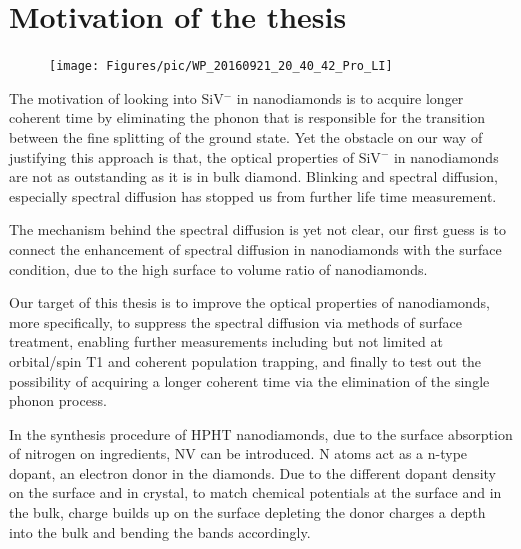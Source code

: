 
\section[Motivation of the thesis]{Motivation of the thesis}
\FloatBarrier
\begin{figure}[h]
	\centering
	\texttt{[image: Figures/pic/WP\_20160921\_20\_40\_42\_Pro\_LI]}
	\caption{}
	\label{fig:wp20160921204042proli}
\end{figure}
\FloatBarrier
The motivation of looking into SiV$^{-}$ in nanodiamonds is to acquire longer coherent time by eliminating the phonon that is responsible for the transition between the fine splitting of the ground state. Yet the obstacle on our way of justifying this approach is that, the optical properties of SiV$^{-}$ in nanodiamonds are not as outstanding as it is in bulk diamond. Blinking and spectral diffusion, especially spectral diffusion has stopped us from further life time measurement. 

The mechanism behind the spectral diffusion is yet not clear, our first guess is to connect the enhancement of spectral diffusion in nanodiamonds with the surface condition, due to the high surface to volume ratio of nanodiamonds.

Our target of this thesis is to improve the optical properties of nanodiamonds, more specifically, to suppress the spectral diffusion via methods of surface treatment, enabling further measurements including but not limited at orbital/spin T1 and coherent population trapping, and finally to test out the possibility of acquiring a longer coherent time via the elimination of the single phonon process.
  
In the synthesis procedure of HPHT nanodiamonds, due to the surface absorption of nitrogen on ingredients, NV can be introduced. N atoms act as a n-type dopant, an electron donor in the diamonds. Due to the different dopant density on the surface and in crystal, to match chemical potentials at the surface and in the bulk, charge builds up on the surface depleting the donor charges a depth into the bulk and bending the bands accordingly. 

